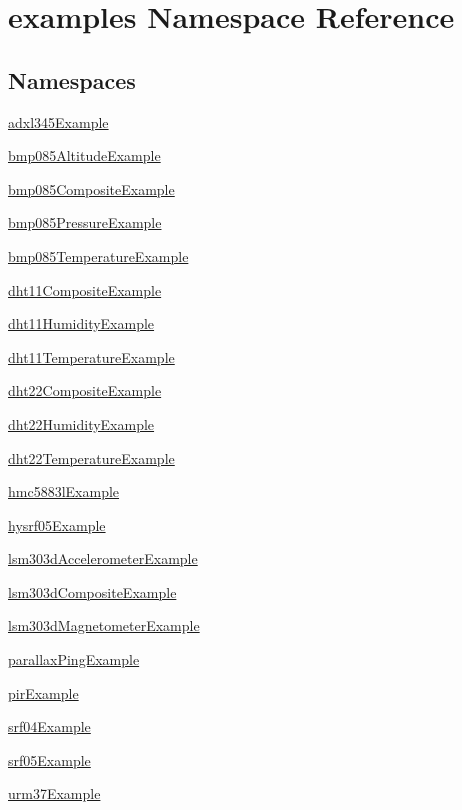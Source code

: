 \hypertarget{namespaceexamples}{}\section{examples Namespace Reference}
\label{namespaceexamples}
\subsection*{Namespaces}
\begin{DoxyCompactItemize}
\item 
 \hyperlink{namespaceexamples_1_1adxl345Example}{adxl345\+Example}
\item 
 \hyperlink{namespaceexamples_1_1bmp085AltitudeExample}{bmp085\+Altitude\+Example}
\item 
 \hyperlink{namespaceexamples_1_1bmp085CompositeExample}{bmp085\+Composite\+Example}
\item 
 \hyperlink{namespaceexamples_1_1bmp085PressureExample}{bmp085\+Pressure\+Example}
\item 
 \hyperlink{namespaceexamples_1_1bmp085TemperatureExample}{bmp085\+Temperature\+Example}
\item 
 \hyperlink{namespaceexamples_1_1dht11CompositeExample}{dht11\+Composite\+Example}
\item 
 \hyperlink{namespaceexamples_1_1dht11HumidityExample}{dht11\+Humidity\+Example}
\item 
 \hyperlink{namespaceexamples_1_1dht11TemperatureExample}{dht11\+Temperature\+Example}
\item 
 \hyperlink{namespaceexamples_1_1dht22CompositeExample}{dht22\+Composite\+Example}
\item 
 \hyperlink{namespaceexamples_1_1dht22HumidityExample}{dht22\+Humidity\+Example}
\item 
 \hyperlink{namespaceexamples_1_1dht22TemperatureExample}{dht22\+Temperature\+Example}
\item 
 \hyperlink{namespaceexamples_1_1hmc5883lExample}{hmc5883l\+Example}
\item 
 \hyperlink{namespaceexamples_1_1hysrf05Example}{hysrf05\+Example}
\item 
 \hyperlink{namespaceexamples_1_1lsm303dAccelerometerExample}{lsm303d\+Accelerometer\+Example}
\item 
 \hyperlink{namespaceexamples_1_1lsm303dCompositeExample}{lsm303d\+Composite\+Example}
\item 
 \hyperlink{namespaceexamples_1_1lsm303dMagnetometerExample}{lsm303d\+Magnetometer\+Example}
\item 
 \hyperlink{namespaceexamples_1_1parallaxPingExample}{parallax\+Ping\+Example}
\item 
 \hyperlink{namespaceexamples_1_1pirExample}{pir\+Example}
\item 
 \hyperlink{namespaceexamples_1_1srf04Example}{srf04\+Example}
\item 
 \hyperlink{namespaceexamples_1_1srf05Example}{srf05\+Example}
\item 
 \hyperlink{namespaceexamples_1_1urm37Example}{urm37\+Example}
\end{DoxyCompactItemize}
